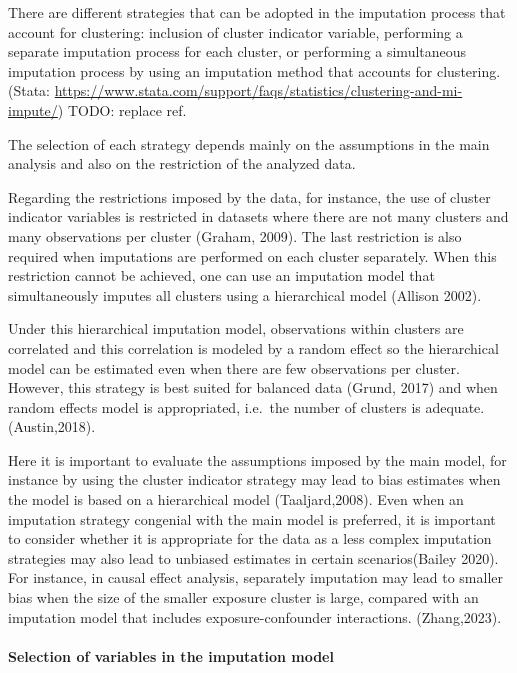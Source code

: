 \documentclass[
]{jss}
\begin{document}
There are different strategies that can be adopted in the imputation
process that account for clustering: inclusion of cluster indicator
variable, performing a separate imputation process for each cluster, or
performing a simultaneous imputation process by using an imputation
method that accounts for clustering.(Stata:
\url{https://www.stata.com/support/faqs/statistics/clustering-and-mi-impute/})
TODO: replace ref.

The selection of each strategy depends mainly on the assumptions in the
main analysis and also on the restriction of the analyzed data.

Regarding the restrictions imposed by the data, for instance, the use of
cluster indicator variables is restricted in datasets where there are
not many clusters and many observations per cluster (Graham, 2009). The
last restriction is also required when imputations are performed on each
cluster separately. When this restriction cannot be achieved, one can
use an imputation model that simultaneously imputes all clusters using a
hierarchical model (Allison 2002).

Under this hierarchical imputation model, observations within clusters
are correlated and this correlation is modeled by a random effect so the
hierarchical model can be estimated even when there are few observations
per cluster. However, this strategy is best suited for balanced data
(Grund, 2017) and when random effects model is appropriated, i.e.~the
number of clusters is adequate. (Austin,2018).

Here it is important to evaluate the assumptions imposed by the main
model, for instance by using the cluster indicator strategy may lead to
bias estimates when the model is based on a hierarchical model
(Taaljard,2008). Even when an imputation strategy congenial with the
main model is preferred, it is important to consider whether it is
appropriate for the data as a less complex imputation strategies may
also lead to unbiased estimates in certain scenarios(Bailey 2020). For
instance, in causal effect analysis, separately imputation may lead to
smaller bias when the size of the smaller exposure cluster is large,
compared with an imputation model that includes exposure-confounder
interactions. (Zhang,2023).

\hypertarget{selection-of-variables-in-the-imputation-model}{%
\paragraph{Selection of variables in the imputation
model}\label{selection-of-variables-in-the-imputation-model}}
\end{document}

